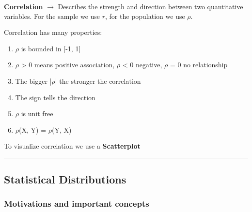 \vspace{10pt}

\textbf{Correlation} $\xrightarrow{}$ Describes the strength and direction between two quantitative variables. For the sample we use $r$, for the population we use $\rho$.

\vspace{10pt}

Correlation has many properties:
\begin{enumerate}
    \item $\rho$ is bounded in [-1, 1]
    \item $\rho$ > 0 means positive association, $\rho$ < 0 negative, $\rho$ = 0 no relationship
    \item The bigger |$\rho$| the stronger the correlation
    \item The sign tells the direction
    \item $\rho$ is unit free
    \item $\rho$(X, Y) = $\rho$(Y, X)
    
\end{enumerate}

To visualize correlation we use a \textbf{Scatterplot}



\hrule

\subsection{Statistical Distributions}

\subsubsection{Motivations and important concepts}


